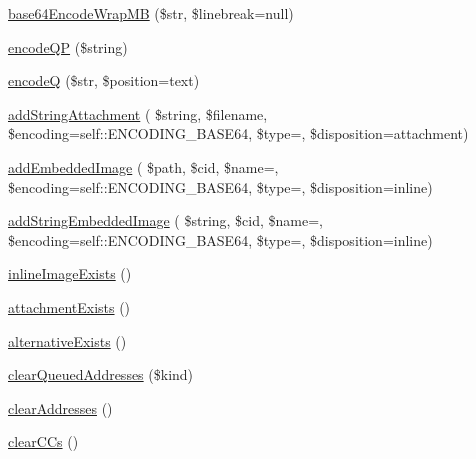 \begin{DoxyCompactItemize}
\hyperlink{classPHPMailer_1_1PHPMailer_1_1PHPMailer_a4a424b86108eaafe1d8369db737cc47f}{base64\+Encode\+Wrap\+MB} (\$str, \$linebreak=null)
\item 
\hyperlink{classPHPMailer_1_1PHPMailer_1_1PHPMailer_ac4459516a6631f487743a77c199bd8c3}{encode\+QP} (\$string)
\item 
\hyperlink{classPHPMailer_1_1PHPMailer_1_1PHPMailer_a72e2d86d123bd899dd9334c3c464ca28}{encodeQ} (\$str, \$position=\textquotesingle{}text\textquotesingle{})
\item 
\hyperlink{classPHPMailer_1_1PHPMailer_1_1PHPMailer_af426f939eb595a49ba39e74558f077d2}{add\+String\+Attachment} ( \$string, \$filename, \$encoding=self\+::\+E\+N\+C\+O\+D\+I\+N\+G\+\_\+\+B\+A\+S\+E64, \$type=\textquotesingle{}\textquotesingle{}, \$disposition=\textquotesingle{}attachment\textquotesingle{})
\item 
\hyperlink{classPHPMailer_1_1PHPMailer_1_1PHPMailer_a68a009a0cb4d9af85dfa0e7068da3330}{add\+Embedded\+Image} ( \$path, \$cid, \$name=\textquotesingle{}\textquotesingle{}, \$encoding=self\+::\+E\+N\+C\+O\+D\+I\+N\+G\+\_\+\+B\+A\+S\+E64, \$type=\textquotesingle{}\textquotesingle{}, \$disposition=\textquotesingle{}inline\textquotesingle{})
\item 
\hyperlink{classPHPMailer_1_1PHPMailer_1_1PHPMailer_aa329b7b65a55a32acdfceae30c1707a8}{add\+String\+Embedded\+Image} ( \$string, \$cid, \$name=\textquotesingle{}\textquotesingle{}, \$encoding=self\+::\+E\+N\+C\+O\+D\+I\+N\+G\+\_\+\+B\+A\+S\+E64, \$type=\textquotesingle{}\textquotesingle{}, \$disposition=\textquotesingle{}inline\textquotesingle{})
\item 
\hyperlink{classPHPMailer_1_1PHPMailer_1_1PHPMailer_a1bfcf7a9b594b407859fe0a8cdc2392a}{inline\+Image\+Exists} ()
\item 
\hyperlink{classPHPMailer_1_1PHPMailer_1_1PHPMailer_acca8a7ac7f5c28bcd33825d1644c4296}{attachment\+Exists} ()
\item 
\hyperlink{classPHPMailer_1_1PHPMailer_1_1PHPMailer_a1a7ec7270ad4e8259c224251966f5867}{alternative\+Exists} ()
\item 
\hyperlink{classPHPMailer_1_1PHPMailer_1_1PHPMailer_a91abc4336a9ab3eef7fad234694fb052}{clear\+Queued\+Addresses} (\$kind)
\item 
\hyperlink{classPHPMailer_1_1PHPMailer_1_1PHPMailer_ac9a1310ac04ff9c1ee82bd9ffb36b398}{clear\+Addresses} ()
\item 
\hyperlink{classPHPMailer_1_1PHPMailer_1_1PHPMailer_a9eef6deb61a88aa4c957f36f8b885ced}{clear\+C\+Cs} ()
\item 

\end{DoxyCompactItemize}
